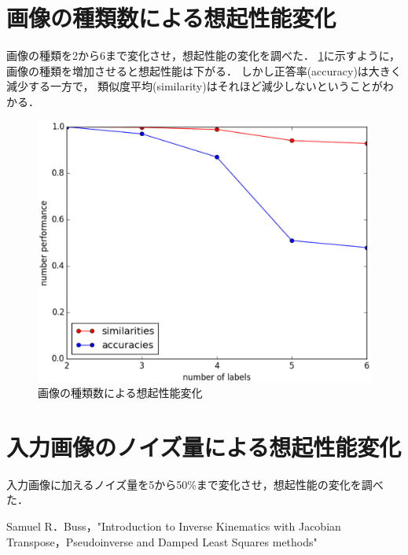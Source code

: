 \documentclass[10pt,twocolumn]{jarticle}
\newcommand{\figref}[1]{\figurename\ref{fig:#1}}
\begin{document}
\section{画像の種類数による想起性能変化}
画像の種類を2から6まで変化させ，想起性能の変化を調べた．
\figref{labels-performance}に示すように，画像の種類を増加させると想起性能は下がる．
しかし正答率(accuracy)は大きく減少する一方で，
類似度平均(similarity)はそれほど減少しないということがわかる．
\begin{figure}[htpb]
  \centering
    \includegraphics[width=\columnwidth]{figs/labels_performance}
    \caption{画像の種類数による想起性能変化}
    \label{fig:labels-performance}
\end{figure}


\section{入力画像のノイズ量による想起性能変化}
入力画像に加えるノイズ量を5から50\%まで変化させ，想起性能の変化を調べた．


\begin{thebibliography}{9}
   Samuel R．Buss，"Introduction to Inverse Kinematics with Jacobian Transpose，Pseudoinverse and Damped Least Squares methods"
\end{thebibliography}
\end{document}
